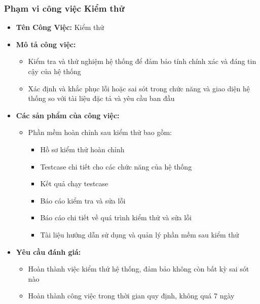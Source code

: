 \subsubsection{Phạm vi công việc Kiểm thử}
\begin{itemize}
    \item \textbf{Tên Công Việc:} Kiểm thử
    \item \textbf{Mô tả công việc:}
    \begin{itemize}
        \item Kiểm tra và thử nghiệm hệ thống để đảm bảo tính chính xác và đáng tin cậy của hệ thống
        \item Xác định và khắc phục lỗi hoặc sai sót trong chức năng và giao diện hệ thống so với tài liệu đặc tả và yêu cầu ban đầu
    \end{itemize}
    \item \textbf{Các sản phẩm của công việc:}
    \begin{itemize}
        \item Phần mềm hoàn chỉnh sau kiểm thử bao gồm:
        \begin{itemize}
            \item Hồ sơ kiểm thử hoàn chỉnh
            \item Testcase chi tiết cho các chức năng của hệ thống
            \item Kết quả chạy testcase
            \item Báo cáo kiểm tra và sửa lỗi
            \item Báo cáo chi tiết về quá trình kiểm thử và sửa lỗi
            \item Tài liệu hướng dẫn sử dụng và quản lý phần mềm sau kiểm thử
        \end{itemize}
    \end{itemize}
    \item \textbf{Yêu cầu đánh giá:}
    \begin{itemize}
        \item Hoàn thành việc kiểm thử hệ thống, đảm bảo không còn bất kỳ sai sót nào
        \item Hoàn thành công việc trong thời gian quy định, không quá 7 ngày
    \end{itemize}
\end{itemize}

